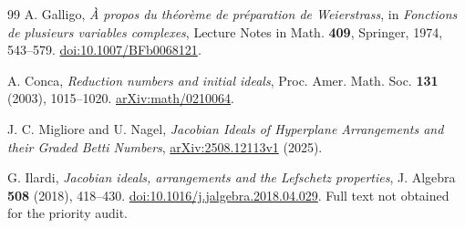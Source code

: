 \documentclass[11pt]{article}
\begin{document}
\begin{thebibliography}{99}
A. Galligo, \emph{\`A propos du th\'eor\`eme de pr\'eparation de Weierstrass},
in \emph{Fonctions de plusieurs variables complexes},
Lecture Notes in Math. \textbf{409}, Springer, 1974, 543--579.
\href{https://doi.org/10.1007/BFb0068121}{doi:10.1007/BFb0068121}.

A. Conca, \emph{Reduction numbers and initial ideals},
Proc. Amer. Math. Soc. \textbf{131} (2003), 1015--1020.
\href{https://arxiv.org/abs/math/0210064}{arXiv:math/0210064}.

J. C. Migliore and U. Nagel,
\emph{Jacobian Ideals of Hyperplane Arrangements and their Graded Betti Numbers},
\href{https://arxiv.org/abs/2508.12113v1}{arXiv:2508.12113v1} (2025).

G. Ilardi, \emph{Jacobian ideals, arrangements and the Lefschetz properties},
J. Algebra \textbf{508} (2018), 418--430.
\href{https://doi.org/10.1016/j.jalgebra.2018.04.029}{doi:10.1016/j.jalgebra.2018.04.029}.
Full text not obtained for the priority audit.
\end{thebibliography}
\end{document}

